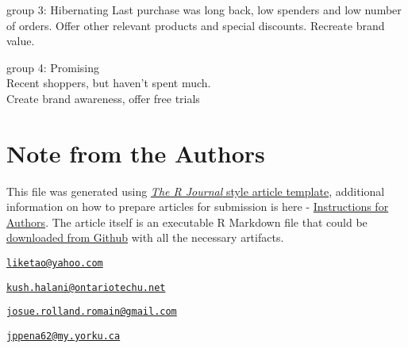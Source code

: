 group 3: Hibernating Last purchase was long back, low spenders and low
number of orders. Offer other relevant products and special discounts.
Recreate brand value.

group 4: Promising\\
Recent shoppers, but haven't spent much.\\
Create brand awareness, offer free trials

\begin{Schunk}
\end{Schunk}



\hypertarget{note-from-the-authors}{%
\section{Note from the Authors}\label{note-from-the-authors}}

This file was generated using
\href{https://github.com/rstudio/rticles}{\emph{The R Journal} style
article template}, additional information on how to prepare articles for
submission is here -
\href{https://journal.r-project.org/share/author-guide.pdf}{Instructions
for Authors}. The article itself is an executable R Markdown file that
could be
\href{https://github.com/ivbsoftware/big-data-final-2/blob/master/docs/R_Journal/big-data-final-2/}{downloaded
from Github} with all the necessary artifacts.


\address{%
Ketao Li\\
York University\\
\\
}
\href{mailto:liketao@yahoo.com}{\nolinkurl{liketao@yahoo.com}}

\address{%
Kush Halani\\
York University\\
\\
}
\href{mailto:kush.halani@ontariotechu.net}{\nolinkurl{kush.halani@ontariotechu.net}}

\address{%
Josue Romain\\
York University\\
\\
}
\href{mailto:josue.rolland.romain@gmail.com}{\nolinkurl{josue.rolland.romain@gmail.com}}

\address{%
Juan Peña\\
York University\\
\\
}
\href{mailto:jppena62@my.yorku.ca}{\nolinkurl{jppena62@my.yorku.ca}}

